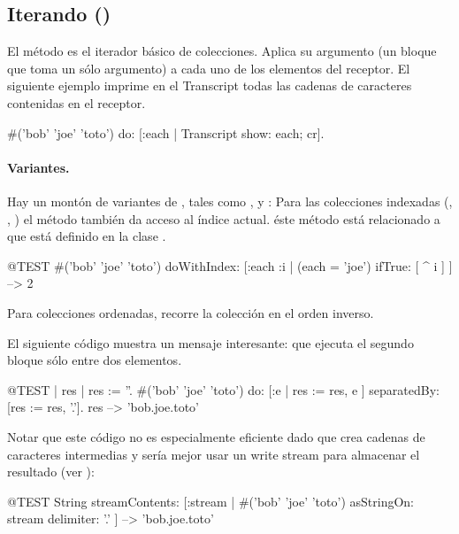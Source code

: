 \documentclass[a4paper,10pt,twoside]{book}
\begin{document}
\subsection{Iterando ()}
El m\'etodo  es el iterador b\'asico de colecciones. Aplica su argumento (un bloque que toma un s\'olo argumento) a cada uno de los elementos del receptor.
El siguiente ejemplo imprime en el Transcript todas las cadenas de caracteres contenidas en el receptor.

\begin{code}{}
#('bob' 'joe' 'toto') do: [:each | Transcript show: each; cr].
\end{code}

\paragraph{Variantes.} Hay un mont\'on de variantes de , tales como \mbox{,} \mbox{} y :
Para las colecciones indexadas (, , ) el m\'etodo  tambi\'en da acceso al \'indice actual. \'este m\'etodo est\'a relacionado a  que est\'a definido en la clase .

\begin{code}{@TEST}
#('bob' 'joe' 'toto') doWithIndex: [:each :i | (each = 'joe') ifTrue: [ ^ i ] ] --> 2
\end{code}

Para colecciones ordenadas,  recorre la colecci\'on en el orden inverso. 

El siguiente c\'odigo muestra un mensaje interesante:  que ejecuta el segundo bloque s\'olo entre dos elementos.
\begin{code}{@TEST | res | }
res := ''.
#('bob' 'joe' 'toto') do: [:e | res := res, e ] separatedBy: [res := res, '.'].
res --> 'bob.joe.toto'
\end{code}
\noindent
Notar que este c\'odigo no es especialmente eficiente dado que crea cadenas de caracteres intermedias y ser\'ia mejor usar un write stream para almacenar el resultado (ver ):
\begin{code}{@TEST}
String streamContents: [:stream | #('bob' 'joe' 'toto') asStringOn: stream delimiter: '.' ] --> 'bob.joe.toto'
\end{code}
\end{document}
